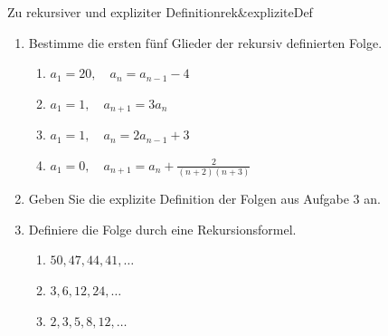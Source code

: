 \begin{ueb}{Zu rekursiver und expliziter Definition}{rek&expliziteDef}
\begin{enumerate}
        \item Bestimme die ersten fünf Glieder der rekursiv definierten Folge.
        \begin{enumerate}
            \item $a_1 = 20, \quad a_{n} = a_{n-1} - 4$
            \item $a_1 = 1, \quad a_{n+1} = 3 a_n$
            \item $a_1 = 1, \quad a_{n} = 2 a_{n-1} + 3$
            \item $a_1 = 0, \quad a_{n+1} = a_n + \frac{2}{(n+2)(n+3)}$
        \end{enumerate}
    
        \item Geben Sie die explizite Definition der Folgen aus Aufgabe 3 an.
        \item Definiere die Folge durch eine Rekursionsformel.
        \begin{enumerate}
            \item $50, 47, 44, 41, \dots$
            \item $3, 6, 12, 24, \dots$
            \item $2, 3, 5, 8, 12, \dots$
        \end{enumerate}
    \end{enumerate}
    





\end{ueb}
